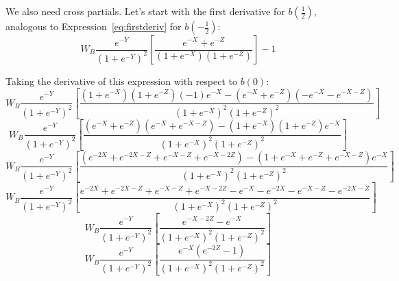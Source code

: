 \documentclass[12pt]{article}
\begin{document}
\begin{itemize}
\vskip1in
We also need cross partials. Let's start with the first derivative for $b\left(\frac{1}{2}\right)$, analogous to Expression~\ref{eq:firstderiv} for $b\left(-\frac{1}{2}\right)$:
\begin{equation}
  W_B\frac{e^{-Y}}{\left(1+e^{-Y}\right)^2}\left[\frac{e^{-X} + e^{-Z}}{\left(1+e^{-X}\right)\left(1+e^{-Z}\right)} \right] - 1
\end{equation}

Taking the derivative of this expression with respect to $b\left(0\right)$:
\[
  W_B\frac{e^{-Y}}{\left(1+e^{-Y}\right)^2}\left[\frac{\left(1+e^{-X}\right)\left(1+e^{-Z}\right)(-1)e^{-X} -\left(e^{-X}+ e^{-Z}\right)\left(-e^{-X}- e^{-X-Z}\right)}{\left(1+e^{-X}\right)^2\left(1+e^{-Z}\right)^2} \right]
\]
\[
  W_B\frac{e^{-Y}}{\left(1+e^{-Y}\right)^2}\left[\frac{\left(e^{-X}+ e^{-Z}\right)\left(e^{-X} + e^{-X-Z}\right) - \left(1+e^{-X}\right)\left(1+e^{-Z}\right)e^{-X}}{\left(1+e^{-X}\right)^2\left(1+e^{-Z}\right)^2} \right]
\]
\[
  W_B\frac{e^{-Y}}{\left(1+e^{-Y}\right)^2}\left[\frac{\left(e^{-2X} + e^{-2X-Z} + e^{-X-Z} + e^{-X-2Z}\right) - \left(1 +e^{-X} +e^{-Z}+ e^{-X-Z} \right)e^{-X}}{\left(1+e^{-X}\right)^2\left(1+e^{-Z}\right)^2} \right]
\]
\[
  W_B\frac{e^{-Y}}{\left(1+e^{-Y}\right)^2}\left[\frac{e^{-2X} + e^{-2X-Z} + e^{-X-Z} + e^{-X-2Z} - e^{-X} - e^{-2X} - e^{-X-Z} - e^{-2X-Z}}{\left(1+e^{-X}\right)^2\left(1+e^{-Z}\right)^2} \right]
\]
\[
  W_B\frac{e^{-Y}}{\left(1+e^{-Y}\right)^2}\left[\frac{e^{-X-2Z} - e^{-X}}{\left(1+e^{-X}\right)^2\left(1+e^{-Z}\right)^2} \right]
\]
\[
  W_B\frac{e^{-Y}}{\left(1+e^{-Y}\right)^2}\left[\frac{e^{-X}\left(e^{-2Z} - 1 \right)}{\left(1+e^{-X}\right)^2\left(1+e^{-Z}\right)^2} \right]
\]



\newpage

\end{itemize}
\end{document}
